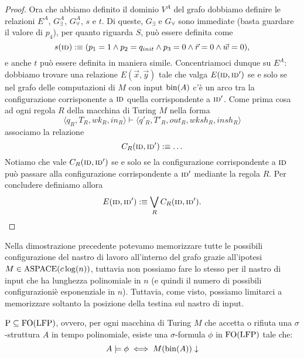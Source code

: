 \begin{proof}
  Ora che abbiamo definito il dominio $V^A$ del grafo dobbiamo definire le
  relazioni $E^A$, $G_\exists^A$, $G_\forall^A$, $s$ e $t$. Di queste, $G_\exists$
  e $G_\forall$ sono immediate
  (basta guardare il valore di $p_4$), per quanto riguarda $S$, può essere
  definita come
  \[s(\textsc{id}) :\equiv (p_1=1 \land p_2 = q_{init} \land p_3=0 \land \vec{r}=0 \land \vec{w}=0),\]
  e anche $t$ può essere definita in maniera simile.
  Concentriamoci dunque su $E^A$: dobbiamo
  trovare una relazione $E(\vec{x},\vec{y})$ tale che
  valga $E(\textsc{id}, \textsc{id}')$ se e solo se nel grafo delle
  computazioni di $M$ con input $\operatorname{bin}(A)$ c'è un arco tra la configurazione
  corrisponente a $\textsc{id}$ quella corrispondente a $\textsc{id}'$.
  Come prima cosa ad ogni regola $R$ della macchina di Turing $M$ nella forma
  \[\langle q_R, T_R, wk_R, in_R \rangle \vdash
   \langle q'_R, T'_R, out_R, wksh_R, insh_R \rangle
  \]
  associamo la relazione
  \[C_R(\textsc{id}, \textsc{id}') :\equiv \ldots \]
  Notiamo che vale $C_R(\textsc{id}, \textsc{id}')$ se e solo se la configurazione corrispondente
  a $\textsc{id}$ può passare alla configurazione corrispondente a $\textsc{id}'$ mediante la regola
  $R$. Per concludere definiamo allora
  \[ E(\textsc{id}, \textsc{id}') :\equiv \bigvee_R C_R(\textsc{id}, \textsc{id}'). \]
\end{proof}

\begin{osservazione}
  Nella dimostrazione precedente potevamo
  memorizzare tutte le possibili configurazione del nastro di lavoro all'interno
  del grafo grazie all'ipotesi $M \in \operatorname{ASPACE}(c \log(n))$, tuttavia non possiamo
  fare lo stesso per il nastro di input che ha lunghezza
  polinomiale in $n$ (e quindi il numero di possibili configurazioniè esponenziale in $n$).
  Tuttavia, come visto, possiamo limitarci a memorizzare soltanto la posizione
  della testina sul nastro di input.
\end{osservazione}

\begin{corollario}
\label{cor:P-subset-FO(LFP)}
 $\operatorname{P} \subseteq \operatorname{FO}(\operatorname{LFP})$, ovvero, per ogni macchina di Turing $M$ che accetta o
 rifiuta una $\sigma$-struttura $A$ in tempo polinomiale, esiste una
 $\sigma$-formula $\phi$ in $\operatorname{FO}(\operatorname{LFP})$ tale che:
 \[ A \models \phi \iff M(\operatorname{bin}(A))\downarrow \]
\end{corollario}



